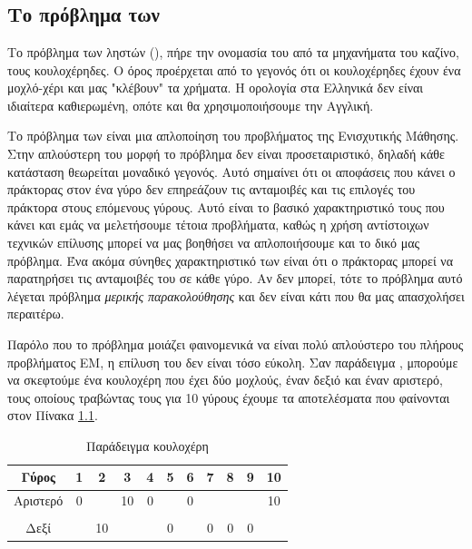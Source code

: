 \chapter{}
\label{chap:bandits}
\section{Το πρόβλημα των }

Το πρόβλημα των ληστών (), πήρε την ονομασία του από τα μηχανήματα του καζίνο, τους κουλοχέρηδες.
Ο όρος  προέρχεται από το γεγονός ότι οι κουλοχέρηδες έχουν ένα μοχλό-χέρι και μας "κλέβουν"
τα χρήματα. Η ορολογία στα Ελληνικά δεν είναι ιδιαίτερα καθιερωμένη, οπότε και θα χρησιμοποιήσουμε την Αγγλική.

Το πρόβλημα των  είναι μια απλοποίηση του προβλήματος της Ενισχυτικής Μάθησης.
Στην απλούστερη του μορφή το πρόβλημα δεν είναι προσεταιριστικό, δηλαδή κάθε κατάσταση θεωρείται μοναδικό γεγονός.
Αυτό σημαίνει ότι οι αποφάσεις που κάνει ο πράκτορας στον ένα γύρο δεν επηρεάζουν τις ανταμοιβές και τις επιλογές του
πράκτορα στους επόμενους γύρους. Αυτό είναι το βασικό χαρακτηριστικό τους που κάνει και εμάς να μελετήσουμε
τέτοια προβλήματα, καθώς η χρήση αντίστοιχων τεχνικών επίλυσης μπορεί να μας βοηθήσει να απλοποιήσουμε και το δικό μας πρόβλημα.
Ένα ακόμα σύνηθες χαρακτηριστικό των  είναι ότι ο πράκτορας μπορεί να παρατηρήσει τις ανταμοιβές του σε κάθε γύρο.
Αν δεν μπορεί, τότε το πρόβλημα αυτό λέγεται πρόβλημα \textit{μερικής παρακολούθησης} και δεν είναι κάτι που θα μας απασχολήσει περαιτέρω.

Παρόλο που το πρόβλημα μοιάζει φαινομενικά να είναι πολύ απλούστερο του πλήρους προβλήματος ΕΜ, η επίλυση του δεν είναι τόσο εύκολη.
Σαν παράδειγμα \cite{lattimore2020bandit}, μπορούμε να σκεφτούμε ένα κουλοχέρη που έχει δύο μοχλούς, έναν δεξιό και έναν αριστερό,
τους οποίους τραβώντας τους για 10 γύρους έχουμε τα αποτελέσματα που φαίνονται στον Πίνακα \ref{tab:bandit_example}.

\begin{table}[ht]
    \centering
    \begin{tabularx}{\textwidth}{ccccccccccc}
        \hline
        Γύρος    & 1 & 2  & 3  & 4 & 5 & 6 & 7 & 8 & 9 & 10 \\
        \hline
        Αριστερό & 0 &    & 10 & 0 &   & 0 &   &   &   & 10 \\ \\
        Δεξί     &   & 10 &    &   & 0 &   & 0 & 0 & 0 &    \\
        \hline
    \end{tabularx}
    \caption{Παράδειγμα κουλοχέρη}
    \label{tab:bandit_example}
\end{table}

